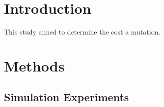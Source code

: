 
\section{Introduction}

This study aimed to determine the cost a mutation. 


\section{Methods}

\subsection{Simulation Experiments}
\section{}

